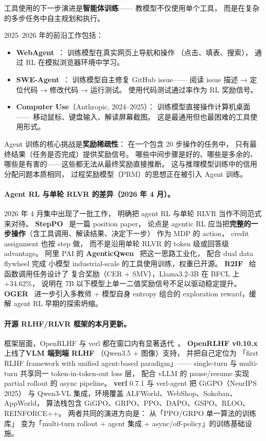 工具使用的下一步演进是\textbf{智能体训练}——
教模型不仅使用单个工具，
而是在复杂的多步任务中自主规划和执行。

2025--2026 年的前沿工作包括：
\begin{itemize}[noitemsep]
  \item \textbf{WebAgent}~\cite{gur2024webagent}：
        训练模型在真实网页上导航和操作
       （点击、填表、搜索），
        通过 RL 在模拟浏览器环境中学习。
  \item \textbf{SWE-Agent}~\cite{yang2024sweagent}：
        训练模型自主修复 GitHub issue——
        阅读 issue 描述 → 定位代码 → 修改代码 → 运行测试。
        使用代码测试通过率作为 RL 奖励信号。
  \item \textbf{Computer Use}（Anthropic, 2024--2025）：
        训练模型直接操作计算机桌面——
        移动鼠标、键盘输入、解读屏幕截图。
        这是最通用但也最困难的工具使用形式。
\end{itemize}

Agent 训练的核心挑战是\textbf{奖励稀疏性}：
在一个包含 20 步操作的任务中，
只有最终结果（任务是否完成）提供奖励信号。
哪些中间步骤是好的、哪些是多余的、
哪些是有害的——这些都无法从最终奖励直接推断。
这与推理模型训练中的信用分配问题本质相同，
过程奖励模型（PRM）的思想正在被引入 Agent 训练。

\paragraph{Agent RL 与单轮 RLVR 的差异（2026 年 4 月）。}
2026 年 4 月集中出现了一批工作，
明确把 agent RL 与单轮 RLVR 当作不同范式来对待。
\textbf{StepPO}~\cite{steppo2026} 是一篇 position paper，
论点是 agentic RL 应当把\textbf{完整的一步操作}（含工具调用、解读结果、决定下一步）
作为 MDP 的 action，
credit assignment 也按 step 做，
而不是沿用单轮 RLVR 的 token 级或回答级 advantage。
阿里 PAI 的 \textbf{AgenticQwen}~\cite{agenticqwen2026}
把这一思路工业化，
配合 dual data flywheel 完成
小模型 industrial-scale 的工具使用训练，权重已开源。
\textbf{R2IF}~\cite{r2if2026} 给函数调用任务设计了
复合奖励（CER + SMV），Llama3.2-3B 在 BFCL 上 +34.62\%，
说明在 7B 以下模型上单一二值奖励信号不足以驱动稳定提升。
\textbf{OGER}~\cite{oger2026} 进一步引入多教师 + 模型自身 entropy
组合的 exploration reward，缓解 agent RL 早期的探索坍缩。

\paragraph{开源 RLHF/RLVR 框架的本月更新。}
框架层面，OpenRLHF 与 verl 都在窗口内有显著迭代~\cite{openrlhf2026,verl2026}。
\textbf{OpenRLHF v0.10.x} 上线了\textbf{VLM 端到端 RLHF}
（Qwen3.5 + 图像）支持，
并把自己定位为
「first RLHF framework with unified agent-based paradigm」——
single-turn 与 multi-turn 共享同一 token-in-token-out loss 层，
配合 vLLM 的 pause/resume 实现 partial rollout 的 async pipeline。
\textbf{verl} 0.7.1 与 verl-agent 把 GiGPO（NeurIPS 2025）
与 Qwen3-VL 集成，环境覆盖 ALFWorld、WebShop、Sokoban、AppWorld，
算法栈包含 GiGPO、GRPO、PPO、DAPO、GSPO、RLOO、REINFORCE++。
两者共同的演进方向是：
从「PPO/GRPO 单一算法的训练库」
变为「multi-turn rollout + agent 集成 + async/off-policy」的训练基础设施。

